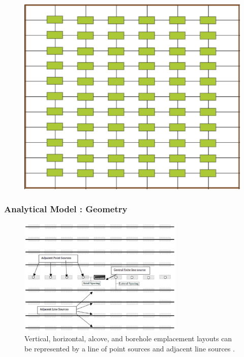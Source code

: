 \begin{frame}
\begin{minipage}{0.3\textwidth}
    \begin{figure}[b]
      \includegraphics[width=\textwidth]{fullGrid.eps}
    \end{figure}
  \end{minipage}
\end{frame}

\begin{frame}
  \frametitle{Analytical Model : Geometry}
  \begin{figure}[h!]
    \begin{center}
      \includegraphics[width=0.7\textwidth]{llnlConcept.eps}
    \end{center}
    \caption{Vertical, horizontal, alcove, and borehole emplacement layouts can 
    be represented by a line of point sources and adjacent line sources 
    \cite{sutton_investigations_2011}.}
    \label{fig:llnl}
  \end{figure}
\end{frame}

